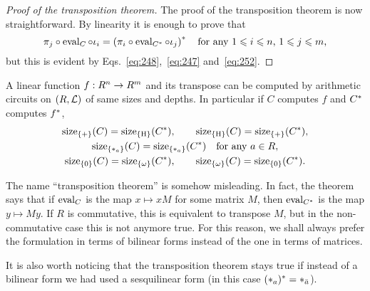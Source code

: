 \begin{proof}[Proof of the transposition theorem]
  The proof of the transposition theorem is now straightforward. By linearity
  it is enough to prove that
  \begin{equation}
    \label{eq:242}
    \pi_j\circ\operatorname{eval}_C\circ\iota_i =
    \left(\pi_i\circ\operatorname{eval}_{C^\ast}\circ\iota_j \right)^\ast
    \quad\text{for any $1\leqslant i\leqslant n$, $1\leqslant j\leqslant m$,}
  \end{equation}
  but this is evident by Eqs.~\eqref{eq:248},~\eqref{eq:247}
  and~\eqref{eq:252}.
\end{proof}

\begin{corollary}
  \label{th:tellegen-coro}
  A linear function $f:R^n\rightarrow R^m$ and its transpose can be computed
  by arithmetic circuits on $(R,\mathcal{L})$ of same sizes and depths. In
  particular if $C$ computes $f$ and $C^\ast$ computes $f^\ast$,
  \begin{gather*}
    \operatorname{size}_{\{+\}}(C) = \operatorname{size}_{\{\operatorname{H}\}}(C^\ast), \qquad  
    \operatorname{size}_{\{\operatorname{H}\}}(C) = \operatorname{size}_{\{+\}}(C^\ast), \\
    \operatorname{size}_{\{*_a\}}(C) = \operatorname{size}_{\{*_a\}}(C^\ast)\quad\text{for any $a\in R$},\\
    \operatorname{size}_{\{0\}}(C) = \operatorname{size}_{\{\omega\}}(C^\ast), \qquad 
    \operatorname{size}_{\{\omega\}}(C) = \operatorname{size}_{\{0\}}(C^\ast).
  \end{gather*}
\end{corollary}

\begin{remark}
  \label{rk:tellegen}
  The name ``transposition theorem'' is somehow misleading. In fact,
  the theorem says that if $\operatorname{eval}_C$ is the map $x\mapsto xM$ for some
  matrix $M$, then $\operatorname{eval}_{C^\ast}$ is the map $y\mapsto My$. If $R$
  is commutative, this is equivalent to transpose $M$, but in the
  non-commutative case this is not anymore true. For this reason, we
  shall always prefer the formulation in terms of bilinear forms
  instead of the one in terms of matrices.

    It is also worth noticing that the transposition
  theorem stays true if instead of a bilinear form we had used a
  sesquilinear form (in this case $(*_{a})^\ast=*_{\bar{a}}$).
\end{remark}


